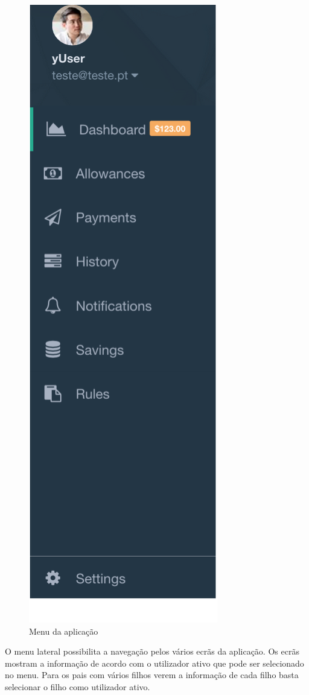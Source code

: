 \begin{figure}[H]
	\begin{center}
		\includegraphics[width=0.25
		\textwidth]{menu/menu.png}
	\end{center}
	\caption{Menu da aplicação}
	\label{fig:10_1}
\end{figure}

O menu lateral possibilita a navegação pelos vários ecrãs da aplicação. Os ecrãs mostram a informação de acordo com o utilizador ativo que pode ser selecionado no menu. Para os pais com vários filhos verem a informação de cada filho basta selecionar o filho como utilizador ativo. 